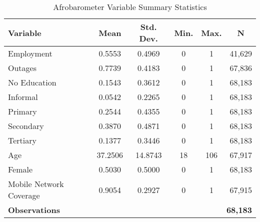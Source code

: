 \documentclass{article}
\begin{document}
\newpage
\begin{table}[t]
\centering
\caption{Afrobarometer Variable Summary Statistics}
\begin{tabular}{lccccc} %
\toprule
\textbf{Variable} & \textbf{Mean} & \textbf{Std. Dev.} & \textbf{Min.} & \textbf{Max.} & \textbf{N} \\
\midrule
Employment          & 0.5553 & 0.4969 & 0 & 1 & 41,629 \\
Outages          & 0.7739 & 0.4183 & 0 & 1 & 67,836 \\
No Education         & 0.1543 & 0.3612 & 0 & 1 & 68,183 \\
Informal        & 0.0542 & 0.2265 & 0 & 1 & 68,183 \\
Primary         & 0.2544 & 0.4355 & 0 & 1 & 68,183 \\
Secondary       & 0.3870 & 0.4871 & 0 & 1 & 68,183 \\
Tertiary        & 0.1377 & 0.3446 & 0 & 1 & 68,183 \\
Age              & 37.2506 & 14.8743 & 18 & 106 & 67,917 \\
Female          & 0.5030 & 0.5000 & 0 & 1 & 68,183 \\
Mobile Network Coverage  & 0.9054 & 0.2927 & 0 & 1 & 67,915 \\
\midrule
\textbf{Observations} & \multicolumn{5}{r}{\textbf{68,183}} \\
\bottomrule
\end{tabular}
\end{table}\
\end{document}
